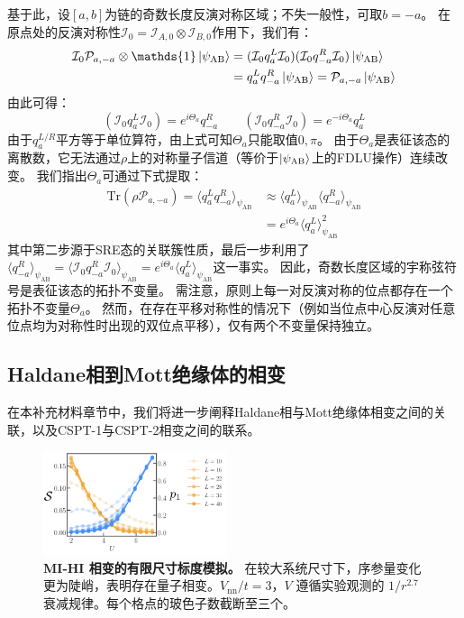 \documentclass[preprint,superscriptaddress,floatfix, nofootinbib]{revtex4-2}
\begin{document}
\begin{CJK*}{UTF8}{gbsn}
基于此，设$[a, b]$为链的奇数长度反演对称区域；不失一般性，可取$b = -a$。
在原点处的反演对称性$\mathcal{I}_0 = \mathcal{I}_{A, 0} \otimes \mathcal{I}_{B, 0}$作用下，我们有：
\begin{align}
    \mathcal{I}_{0} \mathcal{P}_{a, -a} \otimes \mathds{1} \ket{\psi_{\text{AB}}} &= (\mathcal{I}_0 q_{a}^L \mathcal{I}_0)(\mathcal{I}_0 q_{-a}^R \mathcal{I}_0) \ket{\psi_{\text{AB}}} \nonumber\\
    &= q_{a}^L q_{-a}^{R}\ket{\psi_{\text{AB}}} = \mathcal{P}_{a,-a} \ket{\psi_{\text{AB}}}
\end{align}
由此可得：
\begin{equation}
     (\mathcal{I}_0 q_{a}^L \mathcal{I}_0) = e^{i \Theta_a} q_{-a}^{R} \qquad (\mathcal{I}_0 q_{-a}^R \mathcal{I}_0) = e^{-i \Theta_a} q_{a}^{L}
\end{equation}
由于$q_a^{L/R}$平方等于单位算符，由上式可知$\Theta_a$只能取值$0, \pi$。
由于$\Theta_a$是表征该态的离散数，它无法通过$\rho$上的对称量子信道（等价于$\ket{\psi_{\text{AB}}}$上的FDLU操作）连续改变。
我们指出$\Theta_a$可通过下式提取：
\begin{align}
    \text{Tr}\left(\rho \mathcal{P}_{a, -a} \right) = \langle q_a^L q_{-a}^R \rangle_{\psi_{\text{AB}}} &\approx \langle q^L_a \rangle_{\psi_{\text{AB}}} \langle q^R_{-a} \rangle_{\psi_{\text{AB}}}\\
    &= e^{i \Theta_a} \langle q_a^L \rangle^2_{\psi_{\text{AB}}}
\end{align}
其中第二步源于SRE态的关联簇性质，最后一步利用了$\langle q_{-a}^R \rangle_{\psi_{\text{AB}}} = \langle \mathcal{I}_0 q_{-a}^R \mathcal{I}_0 \rangle_{\psi_{\text{AB}}} = e^{i \Theta_a} \langle q_a^{L} \rangle_{\psi_{\text{AB}}}$这一事实。
因此，奇数长度区域的宇称弦符号是表征该态的拓扑不变量。
需注意，原则上每一对反演对称的位点都存在一个拓扑不变量$\Theta_a$。
然而，在存在平移对称性的情况下（例如当位点中心反演对任意位点均为对称性时出现的双位点平移），仅有两个不变量保持独立\cite{Sahay2025}。
\subsection*{Haldane相到Mott绝缘体的相变}

在本补充材料章节中，我们将进一步阐释Haldane相与Mott绝缘体相变之间的关联，以及CSPT-1与CSPT-2相变之间的联系。

\begin{figure}
    \centering
    \includegraphics[width=0.48\textwidth]{figures/Finite_size_scaling.pdf}
    \caption{\textbf{MI-HI 相变的有限尺寸标度模拟。} 在较大系统尺寸下，序参量变化更为陡峭，表明存在量子相变。$V_\mathrm{nn}/t=3$，$V$ 遵循实验观测的 $1/r^{2.7}$ 衰减规律。每个格点的玻色子数截断至三个。}
    \label{fig: finite_size_scaling}
\end{figure}

\end{CJK*}
\end{document}
